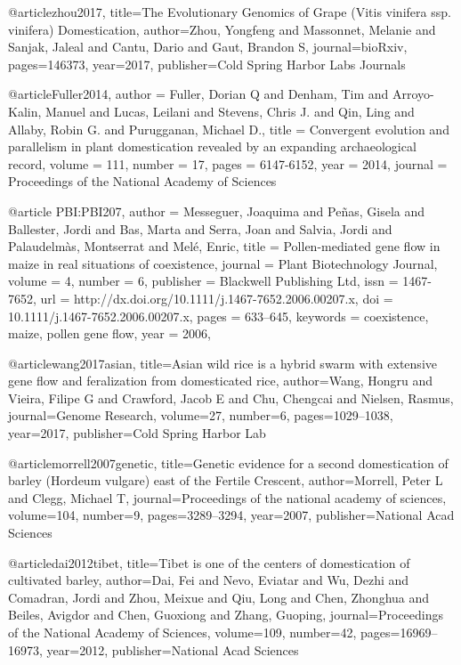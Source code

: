 @article{zhou2017,
  title={The Evolutionary Genomics of Grape (Vitis vinifera ssp. vinifera) Domestication},
  author={Zhou, Yongfeng and Massonnet, Melanie and Sanjak, Jaleal and Cantu, Dario and Gaut, Brandon S},
  journal={bioRxiv},
  pages={146373},
  year={2017},
  publisher={Cold Spring Harbor Labs Journals}
}


@article{Fuller2014,
author = {Fuller, Dorian Q and Denham, Tim and Arroyo-Kalin, Manuel and Lucas, Leilani and Stevens, Chris J. and Qin, Ling and Allaby, Robin G. and Purugganan, Michael D.}, 
title = {Convergent evolution and parallelism in plant domestication revealed by an expanding archaeological record},
volume = {111}, 
number = {17}, 
pages = {6147-6152}, 
year = {2014}, 
journal = {Proceedings of the National Academy of Sciences} 
}

@article {PBI:PBI207,
author = {Messeguer, Joaquima and Peñas, Gisela and Ballester, Jordi and Bas, Marta and Serra, Joan and Salvia, Jordi and Palaudelmàs, Montserrat and Melé, Enric},
title = {Pollen-mediated gene flow in maize in real situations of coexistence},
journal = {Plant Biotechnology Journal},
volume = {4},
number = {6},
publisher = {Blackwell Publishing Ltd},
issn = {1467-7652},
url = {http://dx.doi.org/10.1111/j.1467-7652.2006.00207.x},
doi = {10.1111/j.1467-7652.2006.00207.x},
pages = {633--645},
keywords = {coexistence, maize, pollen gene flow},
year = {2006},
}

@article{wang2017asian,
  title={Asian wild rice is a hybrid swarm with extensive gene flow and feralization from domesticated rice},
  author={Wang, Hongru and Vieira, Filipe G and Crawford, Jacob E and Chu, Chengcai and Nielsen, Rasmus},
  journal={Genome Research},
  volume={27},
  number={6},
  pages={1029--1038},
  year={2017},
  publisher={Cold Spring Harbor Lab}
}

@article{morrell2007genetic,
  title={Genetic evidence for a second domestication of barley (Hordeum vulgare) east of the Fertile Crescent},
  author={Morrell, Peter L and Clegg, Michael T},
  journal={Proceedings of the national academy of sciences},
  volume={104},
  number={9},
  pages={3289--3294},
  year={2007},
  publisher={National Acad Sciences}
}

@article{dai2012tibet,
  title={Tibet is one of the centers of domestication of cultivated barley},
  author={Dai, Fei and Nevo, Eviatar and Wu, Dezhi and Comadran, Jordi and Zhou, Meixue and Qiu, Long and Chen, Zhonghua and Beiles, Avigdor and Chen, Guoxiong and Zhang, Guoping},
  journal={Proceedings of the National Academy of Sciences},
  volume={109},
  number={42},
  pages={16969--16973},
  year={2012},
  publisher={National Acad Sciences}
}

